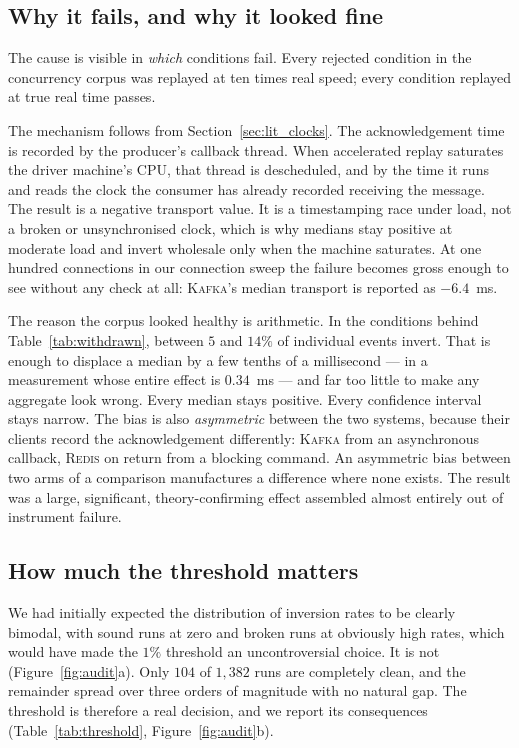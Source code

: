 \documentclass[Afour,sageh,times]{sagej}
\newcommand{\redis}{\textsc{Redis}}
\newcommand{\kafka}{\textsc{Kafka}}
\begin{document}
\subsection{Why it fails, and why it looked fine}

The cause is visible in \emph{which} conditions fail. Every rejected condition in the concurrency
corpus was replayed at ten times real speed; every condition replayed at true real time passes.

The mechanism follows from Section~\ref{sec:lit_clocks}. The acknowledgement time is recorded by
the producer's callback thread. When accelerated replay saturates the driver machine's CPU, that
thread is descheduled, and by the time it runs and reads the clock the consumer has already
recorded receiving the message. The result is a negative transport value. It is a timestamping
race under load, not a broken or unsynchronised clock, which is why medians stay positive at
moderate load and invert wholesale only when the machine saturates. At one hundred connections in
our connection sweep the failure becomes gross enough to see without any check at all: \kafka{}'s
median transport is reported as $-6.4$~ms.

The reason the corpus looked healthy is arithmetic. In the conditions behind
Table~\ref{tab:withdrawn}, between $5$ and $14\%$ of individual events invert. That is enough to
displace a median by a few tenths of a millisecond --- in a measurement whose entire effect is
$0.34$~ms --- and far too little to make any aggregate look wrong. Every median stays positive.
Every confidence interval stays narrow. The bias is also \emph{asymmetric} between the two
systems, because their clients record the acknowledgement differently: \kafka{} from an
asynchronous callback, \redis{} on return from a blocking command. An asymmetric bias between two
arms of a comparison manufactures a difference where none exists. The result was a large,
significant, theory-confirming effect assembled almost entirely out of instrument failure.

\subsection{How much the threshold matters}
\label{sec:threshold}

We had initially expected the distribution of inversion rates to be clearly bimodal, with sound
runs at zero and broken runs at obviously high rates, which would have made the $1\%$ threshold
an uncontroversial choice. It is not (Figure~\ref{fig:audit}a). Only $104$ of $1{,}382$ runs are
completely clean, and the remainder spread over three orders of magnitude with no natural gap.
The threshold is therefore a real decision, and we report its consequences
(Table~\ref{tab:threshold}, Figure~\ref{fig:audit}b).
\end{document}
